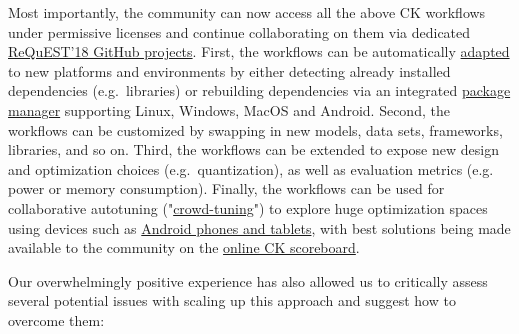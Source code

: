 \documentclass[10pt,onecolumn]{article}
\begin{document}
Most importantly, the community can now access all the above
CK workflows under permissive licenses and continue
collaborating on them via dedicated 
\href{https://github.com/ctuning/ck-request-asplos18-results}{ReQuEST'18 GitHub projects}. 
First, the workflows can be automatically \href{https://github.com/ctuning/ck/wiki/Portable-workflows}{adapted}
to new platforms and environments by either detecting already
installed dependencies (e.g.\ libraries) or rebuilding
dependencies via an integrated \href{http://cKnowledge.org/shared-packages.html}{package manager} supporting
Linux, Windows, MacOS and Android. Second, the workflows can
be customized by swapping in new models, data sets,
frameworks, libraries, and so on. Third, the workflows can be
extended to expose new design and optimization choices (e.g.\ quantization), as well as evaluation metrics (e.g. power
or memory consumption). Finally, the workflows can be used for
collaborative autotuning ("\href{http://cKnowledge.org/rpi-crowd-tuning}{crowd-tuning}") 
to explore huge optimization spaces using devices such as 
\href{https://play.google.com/store/apps/details?id=openscience.crowdsource.video.experiments}{Android phones and tablets}, 
with best solutions being made available to the
community on the \href{http://cKnowledge.org/dnn-crowd-benchmarking-results}{online CK scoreboard}.

Our overwhelmingly positive experience has also allowed us to
critically assess several potential issues with scaling
up this approach and suggest how to overcome them:
\end{document}
